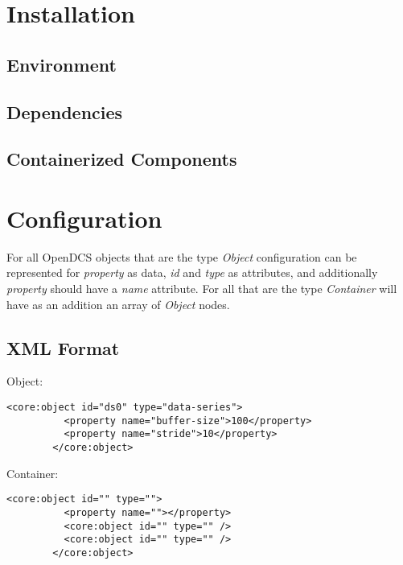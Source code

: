 \documentclass[11pt]{article}
\begin{document}
  \section{Installation}\label{sec:inst}

    \subsection{Environment}\label{sec:inst-env}

    \subsection{Dependencies}\label{sec:inst-dep}

    \subsection{Containerized Components}\label{sec:inst-cont}

  \section{Configuration}\label{sec:cfg}

    For all OpenDCS objects that are the type \emph{Object} configuration can be
    represented for \emph{property} as data, \emph{id} and \emph{type} as
    attributes, and additionally \emph{property} should have a \emph{name}
    attribute. For all that are the type \emph{Container} will have as an
    addition an array of \emph{Object} nodes.

    \subsection{XML Format}\label{sec:cfg-xml}

      Object:

      \begin{lstlisting}[caption={Object Configuration in XML},label={lst:cfg-xml-obj}]
        <core:object id="ds0" type="data-series">
          <property name="buffer-size">100</property>
          <property name="stride">10</property>
        </core:object>
      \end{lstlisting}

      Container:

      \begin{lstlisting}[caption={Container Configuration in XML},label={lst:cfg-xml-ctr}]
        <core:object id="" type="">
          <property name=""></property>
          <core:object id="" type="" />
          <core:object id="" type="" />
        </core:object>
      \end{lstlisting}
\end{document}

